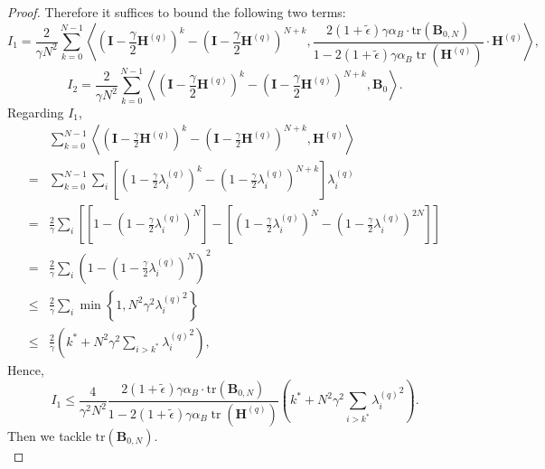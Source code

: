 \documentclass[11pt, letterpaper]{article}
\begin{document}
\begin{proof}
    Therefore it suffices to bound the following two terms:
    \begin{equation*}
        I_1=\frac{2}{\gamma N^{2}}\sum_{k=0}^{N-1}\left\langle(\mathbf{I}-\frac{\gamma}{2}\mathbf{H}^{(q)})^{k}-(\mathbf{I}-\frac{\gamma}{2}\mathbf{H}^{(q)})^{N+k},\frac{2(1+\tilde{\epsilon})\gamma\alpha_B\cdot\mathrm{tr}\left(\mathbf{B}_{0,N}\right)}{1-2(1+\tilde{\epsilon})\gamma\alpha_B\operatorname{tr}(\mathbf{H}^{(q)})}\cdot\mathbf{H}^{(q)}\right\rangle,
    \end{equation*}
    \begin{equation*}
        I_2=\frac{2}{\gamma N^{2}}\sum_{k=0}^{N-1}\left\langle(\mathbf{I}-\frac{\gamma}{2}\mathbf{H}^{(q)})^{k}-(\mathbf{I}-\frac{\gamma}{2}\mathbf{H}^{(q)})^{N+k},\mathbf{B}_{0}\right\rangle.
    \end{equation*}
    Regarding $I_1$,
    \begin{equation*}
        \begin{aligned}
            &\sum_{k=0}^{N-1}\left\langle(\mathbf{I}-\frac{\gamma}{2}\mathbf{H}^{(q)})^{k}-(\mathbf{I}-\frac{\gamma}{2}\mathbf{H}^{(q)})^{N+k},\mathbf{H}^{(q)}\right\rangle\\
            =&\sum_{k=0}^{N-1}\sum_i \left[(1-\frac{\gamma}{2}\lambda_i^{(q)})^k-(1-\frac{\gamma}{2}\lambda_i^{(q)})^{N+k}\right]\lambda_i^{(q)}\\
            =&\frac{2}{\gamma}\sum_i \left[[1-(1-\frac{\gamma}{2}\lambda_i^{(q)})^N]-[(1-\frac{\gamma}{2}\lambda_i^{(q)})^N-(1-\frac{\gamma}{2}\lambda_i^{(q)})^{2N}]\right]\\
            =&\frac{2}{\gamma}\sum_i \left(1-(1-\frac{\gamma}{2}\lambda_i^{(q)})^N\right)^2\\
            \leq&\frac{2}{\gamma}\sum_i \min\left\{1, {N^2\gamma^2}{\lambda_i^{(q)}}^2\right\}\\
            \leq&\frac{2}{\gamma}\left(k^* + {N^2\gamma^2}\sum_{i> k^*}{\lambda_i^{(q)}}^2\right),
        \end{aligned}
    \end{equation*}
    Hence,
    \begin{equation*}
        I_1\leq \frac{4}{\gamma^2N^2}\frac{2(1+\tilde{\epsilon})\gamma\alpha_B\cdot\mathrm{tr}\left(\mathbf{B}_{0,N}\right)}{1-2(1+\tilde{\epsilon})\gamma\alpha_B\operatorname{tr}(\mathbf{H}^{(q)})}\left(k^* + {N^2\gamma^2}\sum_{i> k^*}{\lambda_i^{(q)}}^2\right).
    \end{equation*}
    Then we tackle $\mathrm{tr}(\mathbf{B}_{0,N})$.
    \begin{equation}

\end{equation}
\end{proof}
\end{document}
